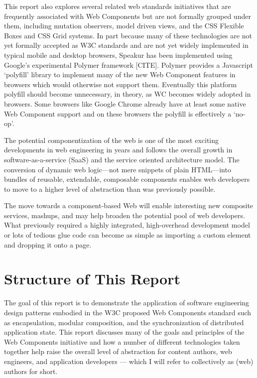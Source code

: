 This report also explores several related web standards initiatives that are frequently associated with Web Components 
but are not formally grouped under them, including mutation observers,
model driven views, 
and the CSS Flexible Boxes
and CSS Grid
systems. 
In part because many of these technologies are not yet formally accepted as W3C standards and are not yet widely implemented in typical mobile and desktop browsers, 
Speakur has been implemented using Google's experimental Polymer framework [CITE].
Polymer provides a Javascript `polyfill'
library to implement many of the new Web Component features in browsers which would otherwise not support them. 
Eventually this platform polyfill should become unnecessary, in theory, as WC becomes widely adopted in browsers.
Some browsers like Google Chrome already have at least some native Web Component support and on these browsers the polyfill is effectively a `no-op'.

The potential componentization of the web is one of the most exciting developments in web engineering in years and follows the overall growth in software-as-a-service (SaaS) 
and the service oriented architecture
model. 
The conversion of dynamic web logic---not mere snippets of plain HTML---into bundles of reusable, extendable, composable components enables web developers to move to a higher level of abstraction than was previously possible.

The move towards a component-based Web will enable interesting new composite services, mashups, and may help broaden the potential pool of web developers. 
What previously required a highly integrated, high-overhead development model or lots of tedious glue code can become as simple as importing a custom element and dropping it onto a page.


\section{Structure of This Report}
%

The goal of this report is to demonstrate the application of software engineering design patterns embodied in the  W3C proposed Web Components standard such as encapsulation, modular composition, and the synchronization of distributed application state. 
This report discusses many of the goals and principles of the Web Components initiative and how a number of different technologies taken together help raise the overall level of abstraction for content authors, web engineers, and application developers --- which I will refer to collectively as (web) authors for short.

